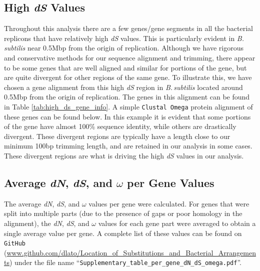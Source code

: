 \documentclass[11pt]{article}
\newcommand{\bass}{\textit{B.\,subtilis}\xspace}
\newcommand{\dn}{\textit{dN}\xspace}
\newcommand{\ds}{\textit{dS}\xspace}
\begin{document}
\subsection{High \ds Values}
Throughout this analysis there are a few genes/gene segments in all the bacterial replicons that have relatively high \ds values.
This is particularly evident in \bass near 0.5Mbp from the origin of replication.
Although we have rigorous and conservative methods for our sequence alignment and trimming, there appear to be some genes that are well aligned and similar for portions of the gene, but are quite divergent for other regions of the same gene.
To illustrate this, we have chosen a gene alignment from this high \ds region in \bass located around 0.5Mbp from the origin of replication.
The genes in this alignment can be found in Table \ref{tab:high_ds_gene_info}.
A simple \texttt{Clustal Omega} protein alignment of these genes can be found below.
In this example it is evident that some portions of the gene have almost 100\% sequence identity, while others are drastically divergent.
These divergent regions are typically have a length close to our minimum 100bp trimming length, and are retained in our analysis in some cases.
These divergent regions are what is driving the high \ds values in our analysis.


\subsection{Average \dn, \ds, and $\omega$ per Gene Values}
The average \dn, \ds, and $\omega$ values per gene were calculated.
For genes that were split into multiple parts (due to the presence of gaps or poor homology in the alignment), the \dn, \ds, and $\omega$ values for each gene part were averaged to obtain a single average value per gene.
\sloppy A complete list of these values can be found on \texttt{GitHub} (\url{www.github.com/dlato/Location_of_Substitutions_and_Bacterial_Arrangements}) under the file name ``\texttt{Supplementary\_table\_per\_gene\_dN\_dS\_omega.pdf}''.
\end{document}
